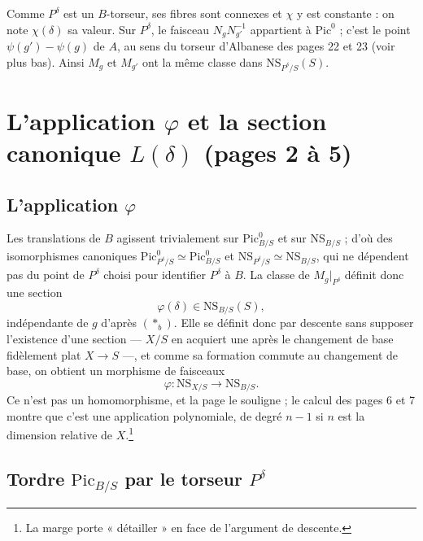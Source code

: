 \documentclass[11pt,a4paper]{article}
\begin{document}
Comme $P^{\delta}$ est un $B$-torseur, ses fibres sont connexes et $\chi$ y est
constante : on note $\chi(\delta)$ sa valeur. Sur $P^{\delta}$, le faisceau
$N_g N_{g'}^{-1}$ appartient à $\mathrm{Pic}^{0}$ ; c'est le point
$\psi(g') - \psi(g)$ de $A$, au sens du torseur d'Albanese des pages 22 et 23
(voir plus bas). Ainsi $M_g$ et $M_{g'}$ ont la même classe dans
$\mathrm{NS}_{P^{\delta}/S}(S)$.

\section*{L'application $\varphi$ et la section canonique $L(\delta)$ (pages 2 à 5)}

\subsection*{L'application $\varphi$}

Les translations de $B$ agissent trivialement sur $\mathrm{Pic}^{0}_{B/S}$ et
sur $\mathrm{NS}_{B/S}$ ; d'où des isomorphismes canoniques
$\mathrm{Pic}^{0}_{P^{\delta}/S} \simeq \mathrm{Pic}^{0}_{B/S}$ et
$\mathrm{NS}_{P^{\delta}/S} \simeq \mathrm{NS}_{B/S}$, qui ne dépendent pas du
point de $P^{\delta}$ choisi pour identifier $P^{\delta}$ à $B$. La classe de
$M_g|_{P^{\delta}}$ définit donc une section
\[
\varphi(\delta) \in \mathrm{NS}_{B/S}(S),
\]
indépendante de $g$ d'après $(*_{b})$. Elle se définit donc par descente sans
supposer l'existence d'une section — $X/S$ en acquiert une après le changement
de base fidèlement plat $X \to S$ —, et comme sa formation commute au
changement de base, on obtient un morphisme de faisceaux
\[
\varphi : \mathrm{NS}_{X/S} \longrightarrow \mathrm{NS}_{B/S}.
\]
Ce n'est pas un homomorphisme, et la page le souligne ; le calcul des pages 6
et 7 montre que c'est une application polynomiale, de degré $n - 1$ si $n$ est
la dimension relative de $X$.\footnote{La marge porte « détailler » en face de
l'argument de descente.}

\subsection*{Tordre $\mathrm{Pic}_{B/S}$ par le torseur $P^{\delta}$}
\end{document}
